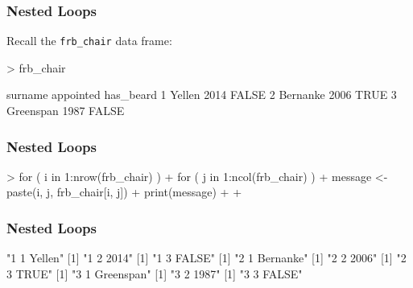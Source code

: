 \documentclass{beamer}
\newcommand{\R}[1]{\texttt{#1}}
\begin{document}
\begin{frame}[fragile]
\frametitle{Nested Loops}
Recall the \R{frb\_chair} data frame:
\begin{Schunk}
\begin{Sinput}
> frb_chair
\end{Sinput}
\begin{Soutput}
    surname appointed has_beard
1    Yellen      2014     FALSE
2  Bernanke      2006      TRUE
3 Greenspan      1987     FALSE
\end{Soutput}
\end{Schunk}

\end{frame}


\begin{frame}[fragile]
\frametitle{Nested Loops}

\begin{Schunk}
\begin{Sinput}
> for ( i in 1:nrow(frb_chair) ) {
+     for ( j in 1:ncol(frb_chair) ) {
+         message <- paste(i, j, frb_chair[i, j])
+         print(message)
+     }
+ }
\end{Sinput}
\end{Schunk}

\end{frame}


\begin{frame}[fragile]
\frametitle{Nested Loops}
\begin{Schunk}
\begin{Soutput}
[1] "1 1 Yellen"
[1] "1 2 2014"
[1] "1 3 FALSE"
[1] "2 1 Bernanke"
[1] "2 2 2006"
[1] "2 3 TRUE"
[1] "3 1 Greenspan"
[1] "3 2 1987"
[1] "3 3 FALSE"
\end{Soutput}
\end{Schunk}

\end{frame}



\end{document}
